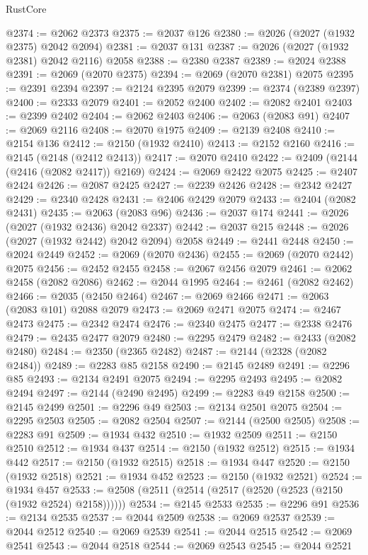 \begin{lexlean}{RustCore}
\begin{coremodule}
@2374 := @2062 @2373
@2375 := @2037 @126
@2380 := @2026 (@2027 (@1932 @2375) @2042 @2094)
@2381 := @2037 @131
@2387 := @2026 (@2027 (@1932 @2381) @2042 @2116) @2058
@2388 := @2380 @2387
@2389 := @2024 @2388
@2391 := @2069 (@2070 @2375)
@2394 := @2069 (@2070 @2381) @2075
@2395 := @2391 @2394
@2397 := @2124 @2395 @2079
@2399 := @2374 (@2389 @2397)
@2400 := @2333 @2079
@2401 := @2052 @2400
@2402 := @2082 @2401
@2403 := @2399 @2402
@2404 := @2062 @2403
@2406 := @2063 (@2083 @91)
@2407 := @2069 @2116
@2408 := @2070 @1975
@2409 := @2139 @2408
@2410 := @2154 @136
@2412 := @2150 (@1932 @2410)
@2413 := @2152 @2160
@2416 := @2145 (@2148 (@2412 @2413))
@2417 := @2070 @2410
@2422 := @2409 (@2144 (@2416 (@2082 @2417)) @2169)
@2424 := @2069 @2422 @2075
@2425 := @2407 @2424
@2426 := @2087 @2425
@2427 := @2239 @2426
@2428 := @2342 @2427
@2429 := @2340 @2428
@2431 := @2406 @2429 @2079
@2433 := @2404 (@2082 @2431)
@2435 := @2063 (@2083 @96)
@2436 := @2037 @174
@2441 := @2026 (@2027 (@1932 @2436) @2042 @2337)
@2442 := @2037 @215
@2448 := @2026 (@2027 (@1932 @2442) @2042 @2094) @2058
@2449 := @2441 @2448
@2450 := @2024 @2449
@2452 := @2069 (@2070 @2436)
@2455 := @2069 (@2070 @2442) @2075
@2456 := @2452 @2455
@2458 := @2067 @2456 @2079
@2461 := @2062 @2458 (@2082 @2086)
@2462 := @2044 @1995
@2464 := @2461 (@2082 @2462)
@2466 := @2035 (@2450 @2464)
@2467 := @2069 @2466
@2471 := @2063 (@2083 @101) @2088 @2079
@2473 := @2069 @2471 @2075
@2474 := @2467 @2473
@2475 := @2342 @2474
@2476 := @2340 @2475
@2477 := @2338 @2476
@2479 := @2435 @2477 @2079
@2480 := @2295 @2479
@2482 := @2433 (@2082 @2480)
@2484 := @2350 (@2365 @2482)
@2487 := @2144 (@2328 (@2082 @2484))
@2489 := @2283 @85 @2158
@2490 := @2145 @2489
@2491 := @2296 @85
@2493 := @2134 @2491 @2075
@2494 := @2295 @2493
@2495 := @2082 @2494
@2497 := @2144 (@2490 @2495)
@2499 := @2283 @49 @2158
@2500 := @2145 @2499
@2501 := @2296 @49
@2503 := @2134 @2501 @2075
@2504 := @2295 @2503
@2505 := @2082 @2504
@2507 := @2144 (@2500 @2505)
@2508 := @2283 @91
@2509 := @1934 @432
@2510 := @1932 @2509
@2511 := @2150 @2510
@2512 := @1934 @437
@2514 := @2150 (@1932 @2512)
@2515 := @1934 @442
@2517 := @2150 (@1932 @2515)
@2518 := @1934 @447
@2520 := @2150 (@1932 @2518)
@2521 := @1934 @452
@2523 := @2150 (@1932 @2521)
@2524 := @1934 @457
@2533 := @2508 (@2511 (@2514 (@2517 (@2520 (@2523 (@2150 (@1932 @2524) @2158))))))
@2534 := @2145 @2533
@2535 := @2296 @91
@2536 := @2134 @2535
@2537 := @2044 @2509
@2538 := @2069 @2537
@2539 := @2044 @2512
@2540 := @2069 @2539
@2541 := @2044 @2515
@2542 := @2069 @2541
@2543 := @2044 @2518
@2544 := @2069 @2543
@2545 := @2044 @2521

\end{coremodule}
\end{lexlean}
